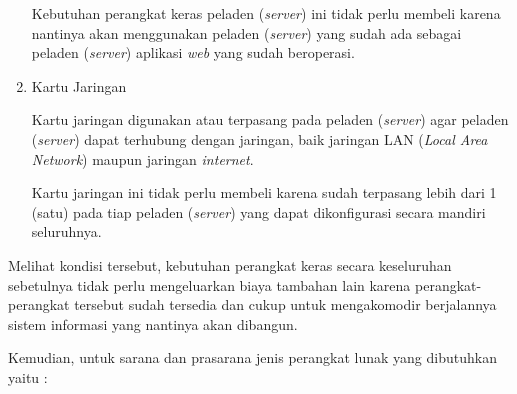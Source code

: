 \documentclass[pdftex,12pt, oneside]{article}
\begin{document}
\begin{enumerate}
\begin{enumerate}
\end{enumerate}

Kebutuhan perangkat keras peladen (\textit{server}) ini tidak perlu membeli karena nantinya akan menggunakan peladen (\textit{server}) yang sudah ada sebagai peladen (\textit{server}) aplikasi \textit{web} yang sudah beroperasi.

	\item Kartu Jaringan

Kartu jaringan digunakan atau terpasang pada peladen (\textit{server}) agar peladen (\textit{server}) dapat terhubung dengan jaringan, baik jaringan LAN (\textit{Local Area Network}) maupun jaringan \textit{internet}. 

Kartu jaringan ini tidak perlu membeli karena sudah terpasang lebih dari 1 (satu) pada tiap peladen (\textit{server}) yang dapat dikonfigurasi secara mandiri seluruhnya.

\end{enumerate}

Melihat kondisi tersebut, kebutuhan perangkat keras secara keseluruhan sebetulnya tidak perlu mengeluarkan biaya tambahan lain karena perangkat-perangkat tersebut sudah tersedia dan cukup untuk mengakomodir berjalannya sistem informasi yang nantinya akan dibangun.


Kemudian, untuk sarana dan prasarana jenis perangkat lunak yang dibutuhkan yaitu :
\end{document}
